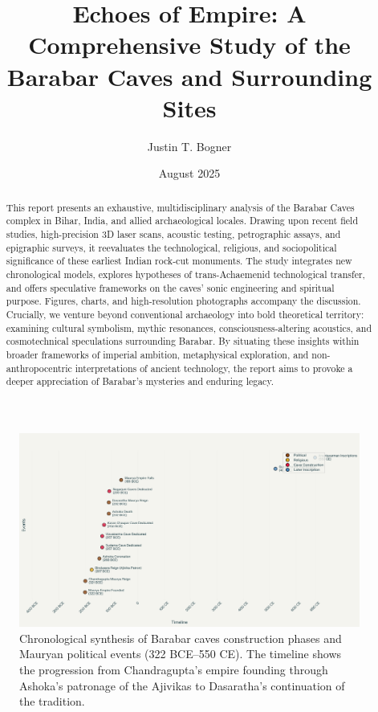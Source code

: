 \documentclass[11pt]{article}
\title{\textbf{Echoes of Empire: A Comprehensive Study of the Barabar Caves and Surrounding Sites}}
\author[1]{Justin T. Bogner}
\affil[1]{Independent Researcher, Pelican's Perspective}
\date{August 2025}
\begin{document}
\maketitle

\begin{abstract}
This report presents an exhaustive, multidisciplinary analysis of the Barabar Caves complex in Bihar, India, and allied archaeological locales. Drawing upon recent field studies, high-precision 3D laser scans, acoustic testing, petrographic assays, and epigraphic surveys, it reevaluates the technological, religious, and sociopolitical significance of these earliest Indian rock-cut monuments. The study integrates new chronological models, explores hypotheses of trans-Achaemenid technological transfer, and offers speculative frameworks on the caves' sonic engineering and spiritual purpose. Figures, charts, and high-resolution photographs accompany the discussion. Crucially, we venture beyond conventional archaeology into bold theoretical territory: examining cultural symbolism, mythic resonances, consciousness-altering acoustics, and cosmotechnical speculations surrounding Barabar. By situating these insights within broader frameworks of imperial ambition, metaphysical exploration, and non-anthropocentric interpretations of ancient technology, the report aims to provoke a deeper appreciation of Barabar's mysteries and enduring legacy.
\end{abstract}

\tableofcontents
\newpage

\begin{figure}[H]
\centering
\includegraphics[width=\linewidth]{barabar_caves_timeline.png}
\caption{Chronological synthesis of Barabar caves construction phases and Mauryan political events (322 BCE–550 CE). The timeline shows the progression from Chandragupta's empire founding through Ashoka's patronage of the Ajivikas to Dasaratha's continuation of the tradition.}
\label{fig:timeline}
\end{figure}
\end{document}
